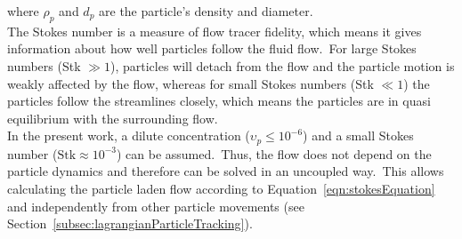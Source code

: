 where $\rho_{p}$ and $d_{p}$ are the particle's density and diameter.\\
The Stokes number is a measure of flow tracer fidelity, which means it gives information about how well particles follow the fluid flow.\ For large Stokes numbers (Stk $\gg 1$), particles will detach from the flow and the particle motion is weakly affected by the flow, whereas for small Stokes numbers (Stk $\ll 1$) the particles follow the streamlines closely, which means the particles are in quasi equilibrium with the surrounding flow.\\
In the present work, a dilute concentration ($\upsilon_{p} \leq 10^{-6}$) and a small Stokes number ($\text{Stk} \approx 10^{-3}$) can be assumed.\ Thus, the flow does not depend on the particle dynamics and therefore can be solved in an uncoupled way.\ This allows calculating the particle laden flow according to Equation~\ref{eqn:stokesEquation} and independently from other particle movements (see Section~\ref{subsec:lagrangianParticleTracking}).\
%
